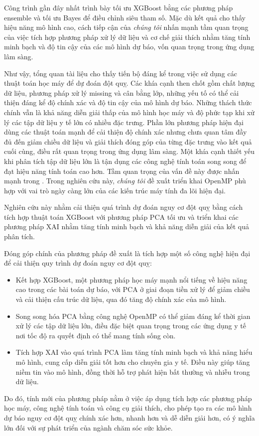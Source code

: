 Công trình gần đây nhất  trình bày tối ưu XGBoost bằng các phương pháp ensemble và tối ưu Bayes để điều chỉnh siêu tham số. Mặc dù kết quả cho thấy hiệu năng mô hình cao, cách tiếp cận của \textit{chúng tôi} nhấn mạnh tầm quan trọng của việc tích hợp phương pháp xử lý dữ liệu và cơ chế giải thích nhằm tăng tính minh bạch và độ tin cậy của các mô hình dự báo, vốn quan trọng trong ứng dụng lâm sàng.

Như vậy, tổng quan tài liệu cho thấy tiến bộ đáng kể trong việc sử dụng các thuật toán học máy để dự đoán đột quỵ. Các khía cạnh then chốt gồm chất lượng dữ liệu, phương pháp xử lý missing và cân bằng lớp, những yếu tố có thể cải thiện đáng kể độ chính xác và độ tin cậy của mô hình dự báo. Những thách thức chính vẫn là khả năng diễn giải thấp của mô hình học máy và độ phức tạp khi xử lý các tập dữ liệu y tế lớn có nhiều đặc trưng. Phần lớn phương pháp hiện đại dùng các thuật toán mạnh để cải thiện độ chính xác nhưng chưa quan tâm đầy đủ đến giảm chiều dữ liệu và giải thích đóng góp của từng đặc trưng vào kết quả cuối cùng, điều rất quan trọng trong ứng dụng lâm sàng. Một khía cạnh thiết yếu khi phân tích tập dữ liệu lớn là tận dụng các công nghệ tính toán song song để đạt hiệu năng tính toán cao hơn. Tầm quan trọng của vấn đề này được nhấn mạnh trong . Trong nghiên cứu này, \textit{chúng tôi} đề xuất triển khai OpenMP phù hợp với vai trò ngày càng lớn của các kiến trúc máy tính đa lõi hiện đại.

Nghiên cứu này nhằm cải thiện quá trình dự đoán nguy cơ đột quỵ bằng cách tích hợp thuật toán XGBoost với phương pháp PCA tối ưu và triển khai các phương pháp XAI nhằm tăng tính minh bạch và khả năng diễn giải của kết quả phân tích.

Đóng góp chính của phương pháp đề xuất là tích hợp một số công nghệ hiện đại để cải thiện quy trình dự đoán nguy cơ đột quỵ:
\begin{itemize}
  \item Kết hợp XGBoost, một phương pháp học máy mạnh nổi tiếng về hiệu năng cao trong các bài toán dự báo, với PCA ở giai đoạn tiền xử lý để giảm chiều và cải thiện cấu trúc dữ liệu, qua đó tăng độ chính xác của mô hình.
  \item Song song hóa PCA bằng công nghệ OpenMP có thể giảm đáng kể thời gian xử lý các tập dữ liệu lớn, điều đặc biệt quan trọng trong các ứng dụng y tế nơi tốc độ ra quyết định có thể mang tính sống còn.
  \item Tích hợp XAI vào quá trình PCA làm tăng tính minh bạch và khả năng hiểu mô hình, cung cấp diễn giải tốt hơn cho chuyên gia y tế. Điều này giúp tăng niềm tin vào mô hình, đồng thời hỗ trợ phát hiện bất thường và nhiễu trong dữ liệu.
\end{itemize}

Do đó, tính mới của phương pháp nằm ở việc áp dụng tích hợp các phương pháp học máy, công nghệ tính toán và công cụ giải thích, cho phép tạo ra các mô hình dự báo nguy cơ đột quỵ chính xác hơn, nhanh hơn và dễ diễn giải hơn, có ý nghĩa lớn đối với sự phát triển của ngành chăm sóc sức khỏe.
